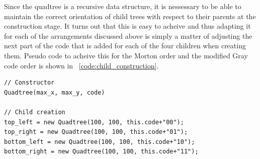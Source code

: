 Since the quadtree is a recursive data structure, it is nessessary to be able
to maintain the correct orientation of child trees with respect to their
parents at the construction stage. It turns out that this is easy to acheive
and thus adapting it for each of the arrangements discussed above is simply a
matter of adjusting the next part of the code that is added for each of the
four children when creating them. Pseudo code to acheive this for the Morton
order and the modified Gray code order is shown in
~\ref{code:child_construction}.

\begin{lstlisting}
// Constructor
Quadtree(max_x, max_y, code)

// Child creation
top_left = new Quadtree(100, 100, this.code+"00");
top_right = new Quadtree(100, 100, this.code+"01");
bottom_left = new Quadtree(100, 100, this.code+"10");
bottom_right = new Quadtree(100, 100, this.code+"11");
\end{lstlisting}

